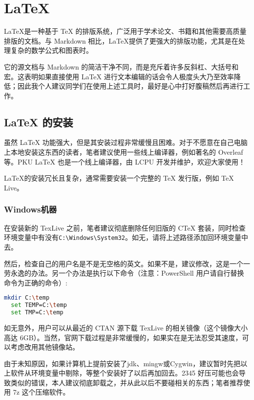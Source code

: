 \documentclass[../main.tex]{subfiles}
\begin{document}
\section{\LaTeX}

\LaTeX 是一种基于 TeX 的排版系统，广泛用于学术论文、书籍和其他需要高质量排版的文档。与 Markdown 相比，\LaTeX 提供了更强大的排版功能，尤其是在处理复杂的数学公式和图表时。

它的源文档与 Markdown 的简洁干净不同，而是充斥着许多反斜杠、大括号和宏。这表明如果直接使用 LaTeX 进行文本编辑的话会令人极度头大乃至效率降低；因此我个人建议同学们在使用上述工具时，最好是心中打好腹稿然后再进行工作。

\subsection{LaTeX 的安装}

虽然 LaTeX 功能强大，但是其安装过程非常缓慢且困难。对于不愿意在自己电脑上本地安装这东西的读者，笔者建议使用一些线上编译器，例如著名的 Overleaf 等。PKU LaTeX 也是一个线上编译器，由 LCPU 开发并维护，欢迎大家使用！

LaTeX的安装冗长且复杂，通常需要安装一个完整的 TeX 发行版，例如 TeX Live。

\subsubsection{Windows机器}

在安装新的 TexLive 之前，笔者建议彻底删除任何旧版的 CTeX 套装，同时检查环境变量中有没有\texttt{C:\textbackslash Windows\textbackslash System32}。如无，请将上述路径添加回环境变量中去。

然后，检查自己的用户名是不是无空格的英文。如果不是，建议修改，这是一个一劳永逸的办法。另一个办法是执行以下命令（注意：PowerShell 用户请自行替换命令为正确的命令）:

\begin{lstlisting}[language=bash]
  mkdir C:\temp
  set TEMP=C:\temp
  set TMP=C:\temp
\end{lstlisting}

如无意外，用户可以从最近的 CTAN 源下载 TexLive 的相关镜像（这个镜像大小高达 6GB）。当然，官网下载过程是非常缓慢的，如果实在是无法忍受其速度，可以考虑改用其他镜像站。

由于未知原因，如果计算机上提前安装了jdk、mingw或Cygwin，建议暂时先把以上软件从环境变量中剔除，等整个安装好了以后再加回去。2345 好压可能也会导致类似的错误，本人建议彻底卸载之，并从此以后不要碰相关的东西；笔者推荐使用 7z 这个压缩软件。
\end{document}
